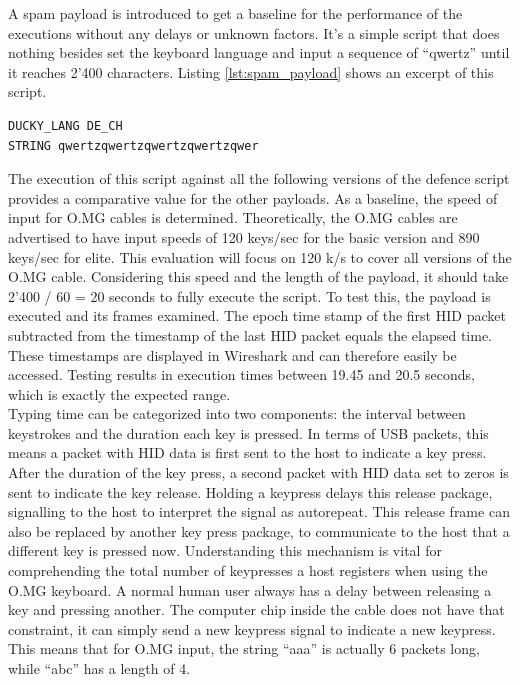 A spam payload is introduced to get a baseline for the performance of the executions without any delays or unknown factors. It's a simple script that does nothing besides set the keyboard language and input a sequence of ``qwertz'' until it reaches 2’400 characters. Listing \ref{lst:spam_payload} shows an excerpt of this script. 


\begin{lstlisting}[caption={Excerpt: write a string of length 2'400 without delays},label=lst:spam_payload, captionpos=b]
DUCKY_LANG DE_CH
STRING qwertzqwertzqwertzqwertzqwer
\end{lstlisting}

The execution of this script against all the following versions of the defence script provides a comparative value for the other payloads.
As a baseline, the speed of input for O.MG cables is determined. Theoretically, the O.MG cables are advertised to have input speeds of 120 keys/sec for the basic version and 890 keys/sec for elite. This evaluation will focus on 120 k/s to cover all versions of the O.MG cable. Considering this speed and the length of the payload, it should take 2'400 / 60 = 20 seconds to fully execute the script. To test this, the payload is executed and its frames examined. The epoch time stamp of the first HID packet subtracted from the timestamp of the last HID packet equals the elapsed time. These timestamps are displayed in Wireshark and can therefore easily be accessed. Testing results in execution times between 19.45 and 20.5 seconds, which is exactly the expected range. \\
Typing time can be categorized into two components: the interval between keystrokes and the duration each key is pressed. In terms of USB packets, this means a packet with HID data is first sent to the host to indicate a key press. After the duration of the key press, a second packet with HID data set to zeros is sent to indicate the key release. Holding a keypress delays this release package, signalling to the host to interpret the signal as autorepeat. This release frame can also be replaced by another key press package, to communicate to the host that a different key is pressed now. Understanding this mechanism is vital for comprehending the total number of keypresses a host registers when using the O.MG keyboard. A normal human user always has a delay between releasing a key and pressing another. The computer chip inside the cable does not have that constraint, it can simply send a new keypress signal to indicate a new keypress. This means that for O.MG input, the string ``aaa'' is actually 6 packets long, while ``abc'' has a length of 4. 

